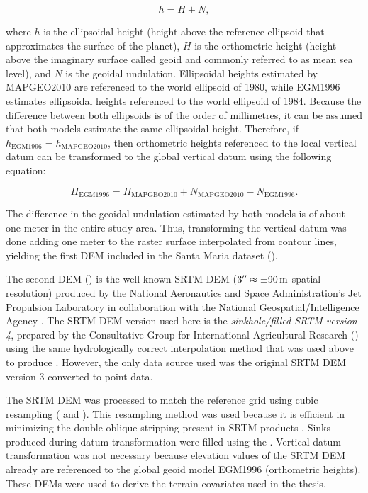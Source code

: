 \begin{equation}
 \label{eq:geoidal}
 h = H + N,
\end{equation}

\noindent where $h$ is the ellipsoidal height (height above the reference ellipsoid that approximates the 
surface of the planet), $H$ is the orthometric height (height above the imaginary surface called geoid and 
commonly referred to as mean sea level), and $N$ is the geoidal undulation. Ellipsoidal heights estimated by 
MAPGEO2010 are referenced to the world ellipsoid of 1980, while EGM1996 estimates ellipsoidal heights 
referenced to the world ellipsoid of 1984. Because the difference between both ellipsoids is of the order of 
millimetres, it can be assumed that both models estimate the same ellipsoidal height. Therefore, if 
$h_{\text{EGM1996}} = h_{\text{MAPGEO2010}}$, then orthometric heights referenced to the local vertical datum 
can be transformed to the global vertical datum using the following equation:

\begin{equation}
 H_{\text{EGM1996}} = H_{\text{MAPGEO2010}} + N_{\text{MAPGEO2010}} - N_{\text{EGM1996}}.
\end{equation}

\noindent The difference in the geoidal undulation estimated by both models is of about one meter in the 
entire study area. Thus, transforming the vertical datum was done adding one meter to the raster surface 
interpolated from contour lines, yielding the first DEM included in the Santa Maria dataset (\demNew{}).

The second DEM (\demOld{}) is the well known SRTM DEM ($\SI{3}{\arcsecond} \approx \SI{\pm90}{\m}$ spatial 
resolution) produced by the National Aeronautics and Space Administration’s Jet Propulsion Laboratory in 
collaboration with the National 
Geospatial\-/Intelligence Agency \cite{RodriguezEtAl2006}. The SRTM DEM version used here is the 
\emph{sinkhole\-/filled SRTM version \num{4}}, prepared by the Consultative Group for International 
Agricultural 
Research (\cgiar) using the same hydrologically correct interpolation method that was used above to produce 
\demNew{} \cite{ReuterEtAl2007, JarvisEtAl2008}. However, the only data source used was the original SRTM DEM 
version 3 
converted to point data.

The SRTM DEM was processed to match the reference grid using cubic resampling ( and 
). This resampling method was used because it is efficient in minimizing the 
double-oblique stripping present in SRTM products \cite{Samuel-RosaEtAl2013c}. Sinks produced during datum 
transformation were filled using the . Vertical datum transformation was not necessary 
because elevation values of the SRTM DEM already are referenced to the global geoid model EGM1996 
(orthometric heights). These DEMs were used to derive the terrain covariates used in the thesis. 

